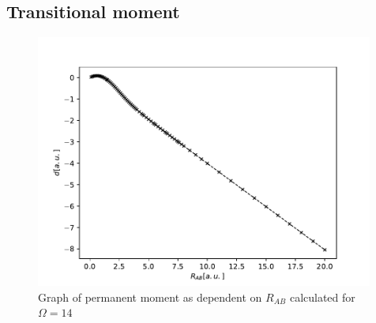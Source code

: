 \documentclass{pracalicmgr}
\begin{document}
\subsection{Transitional moment}

\begin{figure}[H]
    \center
    \includegraphics[width=0.99\textwidth]{14D.pdf}
    \caption{Graph of permanent moment as dependent on $R_{AB}$ calculated for $\Omega = 14$}
    \label{D full}
\end{figure}
\end{document}
